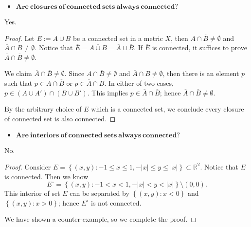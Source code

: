 \begin{Exercise}
\begin{itemize}
\item $\mathbf{Are\ closures\ of\ connected\ sets\ always\ connected?}$
\end{itemize}
\begin{answer}
Yes.
\end{answer}
\begin{proof}
Let $E := A\cup B$ be a connected set in a metric $X$, then $A\cap\overline{B}\neq\emptyset$ and $\overline{A}\cap B\neq\emptyset$. Notice that $\overline{E} = \overline{A\cup B} = \overline{A}\cup\overline{B}$. If $\overline{E}$ is connected, it suffices to prove $\overline{A}\cap \overline{B}\neq\emptyset$.

We claim $\overline{A}\cap\overline{B}\neq\emptyset$. Since $A\cap\overline{B}\neq\emptyset$ and $\overline{A}\cap B\neq\emptyset$, then there is an element $p$ such that $p\in A\cap\overline{B}$ or $p\in \overline{A}\cap B$. In either of two cases, $p\in (A\cup A')\cap(B\cup B')$. This implies $p\in \overline{A}\cap\overline{B}$; hence $\overline{A}\cap\overline{B}\neq\emptyset$.

By the arbitrary choice of $E$ which is a connected set, we conclude every closure of connected set is also connected.
\end{proof}

\begin{itemize}
\item $\mathbf{Are\ interiors\ of\ connected\ sets\ always\ connected?}$
\end{itemize}
\begin{answer}
No.
\end{answer}
\begin{proof}
Consider $E = \left\{(x,y):-1\leq x \leq 1, -|x|\leq y \leq |x|\right\} \subset \mathbb{R}^2$. Notice that $E$ is connected. Then we know
$$
E^{\circ} = \left\{(x,y):-1<x<1, -|x|<y<|x|\right\}\setminus(0,0).
$$
This interior of set $E$ can be separated by $\left\{(x,y):x<0\right\}$ and $\left\{(x,y):x>0\right\}$; hence $E^{\circ}$ is not connected.

We have shown a counter-example, so we complete the proof.
\end{proof}
\end{Exercise}